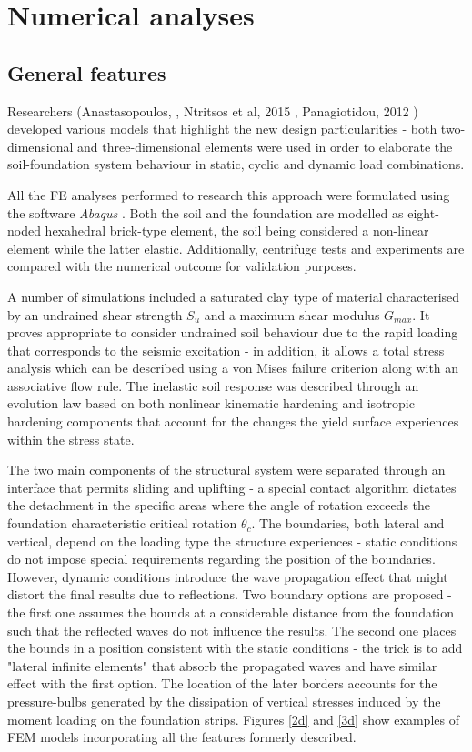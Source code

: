\documentclass[12pt,a4paper]{report}
\begin{document}
\section{Numerical analyses}
\subsection{General features}
Researchers (Anastasopoulos, \cite{anastasopoulos2014simplified}, Ntritsos et al, 2015 \cite{ntritsos2015static}, Panagiotidou, 2012 \cite{panagiotidou2012pushover}) \mbox{developed} various models that highlight the new design particularities - both two-dimensional and three-dimensional elements were used in order to elaborate the soil-foundation system behaviour in static, cyclic and dynamic load combinations. 

All the FE analyses performed to research this approach were formulated using the software \textit{Abaqus} \cite{manualversion}. Both the soil and the foundation are modelled as eight-noded hexahedral brick-type element, the soil being considered a non-linear element while the latter elastic. Additionally, centrifuge tests and experiments are compared with the numerical outcome for validation purposes.

A number of simulations included a saturated clay type of material characterised by an undrained shear strength $S_u$ and a maximum shear modulus $G_{max}$. It proves appropriate to consider undrained soil behaviour due to the rapid loading that corresponds to the seismic excitation - in addition, it allows a total stress analysis which can be described using a von Mises failure criterion along with an associative flow rule. The inelastic soil response was described through an evolution law based on both nonlinear kinematic hardening and isotropic hardening components that account for the changes the yield surface experiences within the stress state.

The two main components of the structural system were separated through an interface that permits sliding and uplifting - a special contact algorithm dictates the detachment in the specific areas where the angle of rotation exceeds the foundation characteristic critical rotation $\theta_c$. The boundaries, both lateral and vertical, depend on the loading type the structure experiences - static conditions do not impose special requirements regarding the position of the boundaries. However, dynamic conditions introduce the wave propagation effect that might distort the final results due to reflections. Two boundary options are proposed - the first one assumes the bounds at a considerable distance from the foundation such that the reflected waves do not influence the results. The second one places the bounds in a position consistent with the static conditions - the trick is to add "lateral infinite elements" that absorb the propagated waves and have similar effect with the first option. The location of the later borders accounts for the pressure-bulbs generated by the dissipation of vertical stresses induced by the moment loading on the foundation strips. Figures \ref{2d} and \ref{3d} show examples of FEM models incorporating all the features formerly described.
\end{document}
